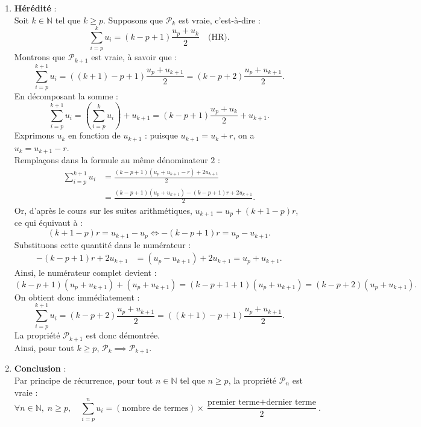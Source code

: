 \documentclass[11pt,a4paper]{article}
\newcommand{\N}{\mathbb{N}}
\begin{document}
\begin{correctionbox}
\begin{enumerate}[label=\textbf{\arabic*.}]
    \item \textbf{Hérédité} :\\
    Soit $k \in \N$ tel que $k \ge p$. Supposons que $\mathcal{P}_k$ est vraie, c'est-à-dire :
    \[
    \sum_{i=p}^k u_i = (k - p + 1) \frac{u_p + u_k}{2} \quad \text{(HR)}.
    \]
    Montrons que $\mathcal{P}_{k+1}$ est vraie, à savoir que :
    \[
    \sum_{i=p}^{k+1} u_i = ((k+1) - p + 1) \frac{u_p + u_{k+1}}{2} = (k - p + 2) \frac{u_p + u_{k+1}}{2}.
    \]
    En décomposant la somme :
    \[
    \sum_{i=p}^{k+1} u_i = \left(\sum_{i=p}^k u_i\right) + u_{k+1} = (k - p + 1) \frac{u_p + u_k}{2} + u_{k+1}.
    \]
    Exprimons $u_k$ en fonction de $u_{k+1}$ : puisque $u_{k+1} = u_k + r$, on a $u_k = u_{k+1} - r$.\\
    Remplaçons dans la formule au même dénominateur $2$ :
    \begin{align*}
    \sum_{i=p}^{k+1} u_i &= \frac{(k - p + 1)(u_p + u_{k+1} - r) + 2u_{k+1}}{2} \\
                        &= \frac{(k - p + 1)(u_p + u_{k+1}) - (k - p + 1)r + 2u_{k+1}}{2}.
    \end{align*}
    Or, d'après le cours sur les suites arithmétiques, $u_{k+1} = u_p + (k+1-p)r$, ce qui équivaut à :
    \[
    (k+1-p)r = u_{k+1} - u_p \iff -(k-p+1)r = u_p - u_{k+1}.
    \]
    Substituons cette quantité dans le numérateur :
    \begin{align*}
    -(k - p + 1)r + 2u_{k+1} &= (u_p - u_{k+1}) + 2u_{k+1} = u_p + u_{k+1}.
    \end{align*}
    Ainsi, le numérateur complet devient :
    \[
    (k - p + 1)(u_p + u_{k+1}) + (u_p + u_{k+1}) = (k - p + 1 + 1)(u_p + u_{k+1}) = (k - p + 2)(u_p + u_{k+1}).
    \]
    On obtient donc immédiatement :
    \[
    \sum_{i=p}^{k+1} u_i = (k - p + 2) \frac{u_p + u_{k+1}}{2} = ((k+1) - p + 1) \frac{u_p + u_{k+1}}{2}.
    \]
    La propriété $\mathcal{P}_{k+1}$ est donc démontrée.\\
    Ainsi, pour tout $k \ge p$, $\mathcal{P}_k \implies \mathcal{P}_{k+1}$.

    \item \textbf{Conclusion} :\\
    Par principe de récurrence, pour tout $n \in \N$ tel que $n \ge p$, la propriété $\mathcal{P}_n$ est vraie :
    \[
    \forall n \in \N, \; n \ge p, \quad \sum_{i=p}^n u_i = (\text{nombre de termes}) \times \frac{\text{premier terme} + \text{dernier terme}}{2}.
    \]
\end{enumerate}
\end{correctionbox}
\end{document}
